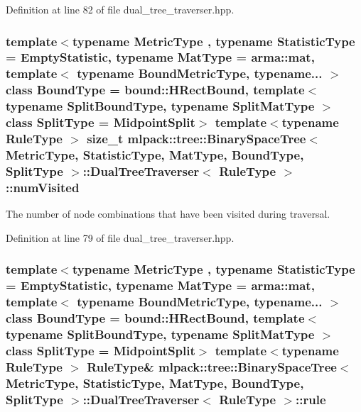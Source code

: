 Definition at line 82 of file dual\+\_\+tree\+\_\+traverser.\+hpp.

\subsubsection[{num\+Visited}]{\setlength{\rightskip}{0pt plus 5cm}template$<$typename Metric\+Type , typename Statistic\+Type  = Empty\+Statistic, typename Mat\+Type  = arma\+::mat, template$<$ typename Bound\+Metric\+Type, typename... $>$ class Bound\+Type = bound\+::\+H\+Rect\+Bound, template$<$ typename Split\+Bound\+Type, typename Split\+Mat\+Type $>$ class Split\+Type = Midpoint\+Split$>$ template$<$typename Rule\+Type $>$ size\+\_\+t {\bf mlpack\+::tree\+::\+Binary\+Space\+Tree}$<$ Metric\+Type, Statistic\+Type, Mat\+Type, Bound\+Type, Split\+Type $>$\+::{\bf Dual\+Tree\+Traverser}$<$ Rule\+Type $>$\+::num\+Visited\hspace{0.3cm}{\ttfamily [private]}}\label{classmlpack_1_1tree_1_1BinarySpaceTree_1_1DualTreeTraverser_a840ea99c90963e3dbda417525da21647}


The number of node combinations that have been visited during traversal. 



Definition at line 79 of file dual\+\_\+tree\+\_\+traverser.\+hpp.

\subsubsection[{rule}]{\setlength{\rightskip}{0pt plus 5cm}template$<$typename Metric\+Type , typename Statistic\+Type  = Empty\+Statistic, typename Mat\+Type  = arma\+::mat, template$<$ typename Bound\+Metric\+Type, typename... $>$ class Bound\+Type = bound\+::\+H\+Rect\+Bound, template$<$ typename Split\+Bound\+Type, typename Split\+Mat\+Type $>$ class Split\+Type = Midpoint\+Split$>$ template$<$typename Rule\+Type $>$ Rule\+Type\& {\bf mlpack\+::tree\+::\+Binary\+Space\+Tree}$<$ Metric\+Type, Statistic\+Type, Mat\+Type, Bound\+Type, Split\+Type $>$\+::{\bf Dual\+Tree\+Traverser}$<$ Rule\+Type $>$\+::rule\hspace{0.3cm}{\ttfamily [private]}}\label{classmlpack_1_1tree_1_1BinarySpaceTree_1_1DualTreeTraverser_a939da9268b4b27955c49aa59788a017f}


